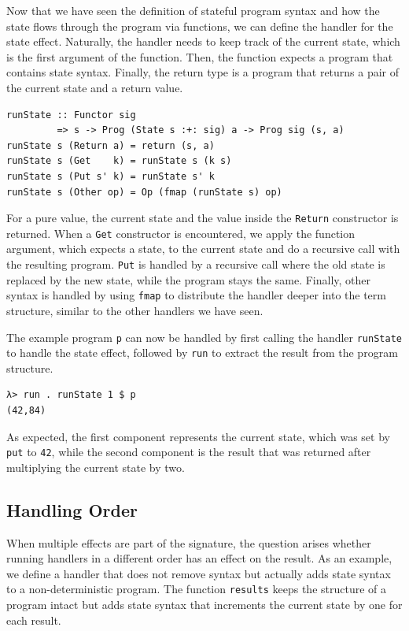 \documentclass[a4paper, 11pt, fleqn, twoside, abstract=on]{scrreprt}
\newcommand{\hinl}[1]{\texttt{#1}}
\begin{document}
Now that we have seen the definition of stateful program syntax and how the state flows through the program via functions, we can define the handler for the state effect.
Naturally, the handler needs to keep track of the current state, which is the first argument of the function.
Then, the function expects a program that contains state syntax.
Finally, the return type is a program that returns a pair of the current state and a return value.

\begin{verbatim}
runState :: Functor sig 
         => s -> Prog (State s :+: sig) a -> Prog sig (s, a)
runState s (Return a) = return (s, a)
runState s (Get    k) = runState s (k s)
runState s (Put s' k) = runState s' k
runState s (Other op) = Op (fmap (runState s) op)
\end{verbatim}

For a pure value, the current state and the value inside the \hinl{Return} constructor is returned.
When a \hinl{Get} constructor is encountered, we apply the function argument, which expects a state, to the current state and do a recursive call with the resulting program.
\hinl{Put} is handled by a recursive call where the old state is replaced by the new state, while the program stays the same.
Finally, other syntax is handled by using \hinl{fmap} to distribute the handler deeper into the term structure, similar to the other handlers we have seen.

The example program \hinl{p} can now be handled by first calling the handler \hinl{runState} to handle the state effect, followed by \hinl{run} to extract the result from the program structure.

\begin{verbatim}
λ> run . runState 1 $ p
(42,84)
\end{verbatim}

As expected, the first component represents the current state, which was set by \hinl{put} to \hinl{42}, while the second component is the result that was returned after multiplying the current state by two.

\subsection{Handling Order}
When multiple effects are part of the signature, the question arises whether running handlers in a different order has an effect on the result.
As an example, we define a handler that does not remove syntax but actually adds state syntax to a non-deterministic program.
The function \hinl{results} keeps the structure of a program intact but adds state syntax that increments the current state by one for each result.
\end{document}
